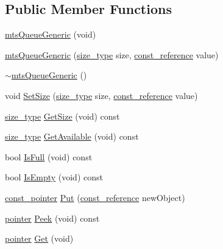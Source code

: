 \subsection*{Public Member Functions}
\begin{DoxyCompactItemize}
\item 
\hyperlink{classmts_queue_generic_a84e191a381314f2a44b713d23b09cafc}{mts\+Queue\+Generic} (void)
\item 
\hyperlink{classmts_queue_generic_a9235564499c2a66504dbcde97d82f10f}{mts\+Queue\+Generic} (\hyperlink{classmts_queue_generic_a3812ba15591f4a89a9df272391739e6f}{size\+\_\+type} size, \hyperlink{classmts_queue_generic_ad133c14265ada42f3347b90ccdd28cd3}{const\+\_\+reference} value)
\item 
\hyperlink{classmts_queue_generic_a21d824a56358714c93f36e43c516f3bd}{$\sim$mts\+Queue\+Generic} ()
\item 
void \hyperlink{classmts_queue_generic_ab0e40851168a01ec0d36cd16683d5971}{Set\+Size} (\hyperlink{classmts_queue_generic_a3812ba15591f4a89a9df272391739e6f}{size\+\_\+type} size, \hyperlink{classmts_queue_generic_ad133c14265ada42f3347b90ccdd28cd3}{const\+\_\+reference} value)
\item 
\hyperlink{classmts_queue_generic_a3812ba15591f4a89a9df272391739e6f}{size\+\_\+type} \hyperlink{classmts_queue_generic_a58241087cc4b9e64831ec1bde41a123c}{Get\+Size} (void) const 
\item 
\hyperlink{classmts_queue_generic_a3812ba15591f4a89a9df272391739e6f}{size\+\_\+type} \hyperlink{classmts_queue_generic_a73daa67e176f48c0f7a03c8d3b8d5348}{Get\+Available} (void) const 
\item 
bool \hyperlink{classmts_queue_generic_a2b1cf8ab9c5f99e1f22836411b73528f}{Is\+Full} (void) const 
\item 
bool \hyperlink{classmts_queue_generic_abdc2488d57e0a116ab3c90e8c988741b}{Is\+Empty} (void) const 
\item 
\hyperlink{classmts_queue_generic_a9b295370295fe53fee2f04a2ebd929b8}{const\+\_\+pointer} \hyperlink{classmts_queue_generic_a1b95d054af81e3cc2995f430fce6c31a}{Put} (\hyperlink{classmts_queue_generic_ad133c14265ada42f3347b90ccdd28cd3}{const\+\_\+reference} new\+Object)
\item 
\hyperlink{classmts_queue_generic_aa3ad46661cfdf9f182fd9c32315930a5}{pointer} \hyperlink{classmts_queue_generic_ad5fc929dba92870d7341fd3007ea4645}{Peek} (void) const 
\item 
\hyperlink{classmts_queue_generic_aa3ad46661cfdf9f182fd9c32315930a5}{pointer} \hyperlink{classmts_queue_generic_a6f4683c5e15ac84e8d63275eafde0067}{Get} (void)
\end{DoxyCompactItemize}
